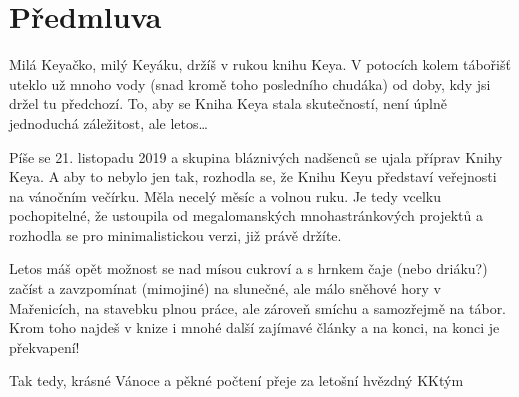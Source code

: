 
\chapter{Předmluva} %
\label{cha:předmluva}

Milá Keyačko, milý Keyáku,
držíš v rukou knihu Keya. V potocích kolem tábořišť uteklo už mnoho vody (snad kromě toho posledního chudáka) od doby, kdy jsi držel tu předchozí. To, aby se Kniha Keya stala skutečností, není úplně jednoduchá záležitost, ale letos…

Píše se 21. listopadu 2019 a skupina bláznivých nadšenců se ujala příprav Knihy Keya. A aby to nebylo jen tak, rozhodla se, že Knihu Keyu představí veřejnosti na vánočním večírku. Měla necelý měsíc a volnou ruku. Je tedy vcelku pochopitelné, že ustoupila od megalomanských mnohastránkových projektů a rozhodla se pro minimalistickou verzi, již právě držíte.

Letos máš opět možnost se nad mísou cukroví a s hrnkem čaje (nebo driáku?) začíst a zavzpomínat (mimojiné) na slunečné, ale málo sněhové hory v Mařenicích, na stavebku plnou práce, ale zároveň smíchu a samozřejmě na tábor. Krom toho najdeš v knize i mnohé další zajímavé články a na konci, na konci je překvapení!

Tak tedy, krásné Vánoce a pěkné počtení
přeje za letošní hvězdný KKtým

\restoregeometry

\clearpage